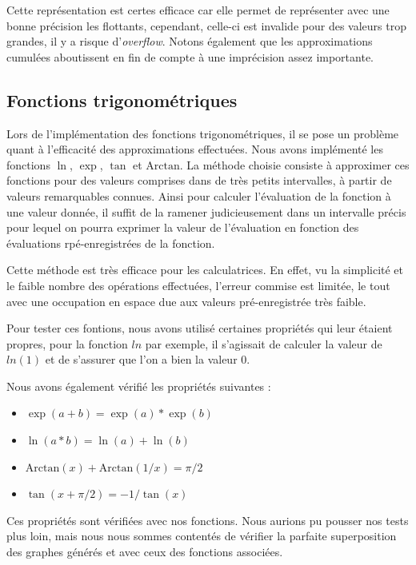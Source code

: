 \documentclass{article}
\begin{document}
Cette représentation est certes efficace car elle permet de représenter avec une bonne précision les flottants, cependant, celle-ci est invalide pour des valeurs trop grandes, il y a risque d'\textit{overflow}. Notons également que les approximations cumulées aboutissent en fin de compte à une imprécision assez importante.


\subsection{Fonctions trigonométriques}
 Lors de l'implémentation des fonctions trigonométriques, il se pose un problème quant à l'efficacité des approximations effectuées. Nous avons implémenté les fonctions $\ln$, $\exp$, $\tan$ et $\text{Arctan}$. La méthode choisie consiste à approximer ces fonctions pour des valeurs comprises dans de très petits intervalles, à partir de valeurs remarquables connues. Ainsi pour calculer l'évaluation de la fonction à une valeur donnée, il suffit de la ramener judicieusement dans un intervalle précis pour lequel on pourra exprimer la valeur de l'évaluation en fonction des évaluations rpé-enregistrées de la fonction.

Cette méthode est très efficace pour les calculatrices. En effet, vu la simplicité et le faible nombre des opérations effectuées, l'erreur commise est limitée, le tout avec une occupation en espace due aux valeurs pré-enregistrée très faible.

Pour tester ces fontions, nous avons utilisé certaines propriétés qui leur étaient propres, pour la fonction $ln$ par exemple, il s'agissait de calculer la valeur de $ln(1)$ et de s'assurer que l'on a bien la valeur $0$.

Nous avons également vérifié les propriétés suivantes :

\begin{itemize}
\item $ \exp ( a + b) = \exp(a)*\exp(b)$

 
\item$ \ln ( a*b)= \ln(a) + \ln(b)$

 
\item$\text{Arctan}(x)+ \text{Arctan}(1/x) = \pi/2 $


\item$\tan(x + \pi/2 ) = -1/\tan (x) $
\end{itemize}
Ces propriétés sont vérifiées avec nos fonctions. Nous aurions pu pousser nos tests plus loin, mais nous nous sommes contentés de vérifier la parfaite superposition des graphes générés et avec ceux des fonctions associées.
\end{document}
